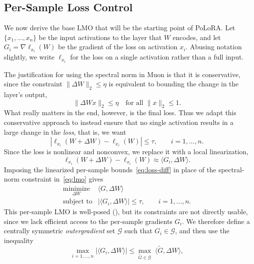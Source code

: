 \documentclass[11pt]{article}
\newcommand{\ip}[1]{\langle #1 \rangle}
\newcommand{\norm}[1]{\| #1\|}
\newcommand{\methodname}{PoLoRA\xspace}
\theoremstyle{plain}
\theoremstyle{definition}
\theoremstyle{remark}
\theoremstyle{definition}
\begin{document}
\subsection{Per-Sample Loss Control}\label{sec:sample-loss-lmo}
We now derive the base LMO that will be the starting point of \methodname{}.
Let $\{x_1, \ldots, x_n\}$ be the input activations to the layer that $W$ encodes, and let $G_i = \nabla \ell_{x_i}(W)$ be the gradient of the loss on activation $x_i$. Abusing notation slightly, we write $\ell_{x_i}$ for the loss on a single activation rather than a full input.

The justification for using the spectral norm in Muon is that it is conservative, since the constraint $\norm{\Delta W}_2 \le \eta$ is equivalent to bounding the change in the layer's output,
\[\norm{\Delta W x}_2 \leq \eta \quad \text{for all } \norm{x}_2 \leq 1.\]
What really matters in the end, however, is the final loss. Thus we adapt this conservative approach to instead ensure that no single activation results in a large change in the \emph{loss}, that is, we want
\begin{equation}\label{eq:loss-diff}
     |\ell_{x_i}(W +\Delta W) - \ell_{x_i} (W)|\leq \tau, \qquad  i=1,\ldots, n.
\end{equation} 
Since the loss is nonlinear and nonconvex, we replace it with a local linearization,
\[  
\ell_{x_i}(W +\Delta W) -\ell_{x_i} (W)  \approx \ip{G_i, \Delta W}. 
\]
Imposing the linearized per-sample bounds~\eqref{eq:loss-diff} in place of the spectral-norm constraint in~\eqref{eq:lmo} gives
\begin{equation}
 \begin{array}{ll}
  \underset{\Delta W}{\mathrm{minimize}} &
  \ip{G, \Delta W} \\
  \mbox{subject to} &
  \displaystyle  
|\ip{G_i, \Delta W}|
  \le \tau, \qquad i=1,\ldots, n.
  \end{array}
  \label{eq:sample-lmo}
\end{equation}
This per-sample LMO is well-posed (), but its constraints are not directly usable, since we lack efficient access to the per-sample gradients $G_i$. We therefore define a centrally symmetric \emph{outergradient} set $\mathcal{G}$ such that $G_i \in \mathcal{G}$, and then use the inequality
\begin{equation} \label{eq:outgrad1}
    \max_{i=1,\ldots, n}  |\ip{G_i, \Delta W}|
    \leq   \max_{\widetilde{G} \in \mathcal{G}} \; \ip{\widetilde{G}, \Delta W},
\end{equation} 
\end{document}
